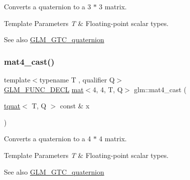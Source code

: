 Converts a quaternion to a 3 $\ast$ 3 matrix.


\begin{DoxyTemplParams}{Template Parameters}
{\em T} & Floating-\/point scalar types.\\
\hline
\end{DoxyTemplParams}
\begin{DoxySeeAlso}{See also}
\mbox{\hyperlink{group__gtc__quaternion}{G\+L\+M\+\_\+\+G\+T\+C\+\_\+quaternion}} 
\end{DoxySeeAlso}
\mbox{\label{group__gtc__quaternion_ga8e2085f17cd5aae423c04536524f11b3}} 
\subsubsection{\texorpdfstring{mat4\+\_\+cast()}{mat4\_cast()}}
{\footnotesize\ttfamily template$<$typename T , qualifier Q$>$ \\
\mbox{\hyperlink{setup_8hpp_ab2d052de21a70539923e9bcbf6e83a51}{G\+L\+M\+\_\+\+F\+U\+N\+C\+\_\+\+D\+E\+CL}} \mbox{\hyperlink{structglm_1_1mat}{mat}}$<$4, 4, T, Q$>$ glm\+::mat4\+\_\+cast (\begin{DoxyParamCaption}\item[{\mbox{\hyperlink{structglm_1_1tquat}{tquat}}$<$ T, Q $>$ const \&}]{x }\end{DoxyParamCaption})}

Converts a quaternion to a 4 $\ast$ 4 matrix.


\begin{DoxyTemplParams}{Template Parameters}
{\em T} & Floating-\/point scalar types.\\
\hline
\end{DoxyTemplParams}
\begin{DoxySeeAlso}{See also}
\mbox{\hyperlink{group__gtc__quaternion}{G\+L\+M\+\_\+\+G\+T\+C\+\_\+quaternion}} 
\end{DoxySeeAlso}
\mbox{\label{group__gtc__quaternion_ga6c31ccbb8548b2b24226901e602dfc0a}} 
